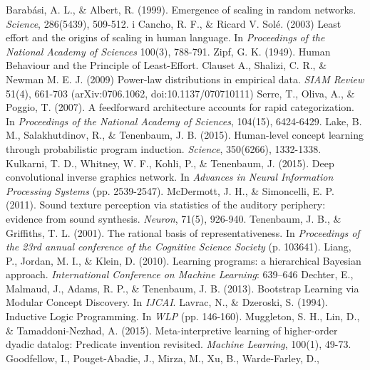 \documentclass[11pt,letterpaper]{article}
\begin{document}
\begin{thebibliography}{}
    Barab\'asi, A. L., \& Albert, R. (1999).
    Emergence of scaling in random networks.
    \emph{Science}, 286(5439), 509-512.
   i Cancho, R. F., \& Ricard V. Solé. (2003)
    Least effort and the origins of scaling in human language.
    In \emph{Proceedings of the National Academy of Sciences} 100(3), 788-791.
   Zipf, G. K. (1949).
    Human Behaviour and the Principle of Least-Effort.
   Clauset A., Shalizi, C. R., \& Newman M. E. J.  (2009)
    Power-law distributions in empirical data.
    \emph{SIAM Review} 51(4), 661-703 (arXiv:0706.1062, doi:10.1137/070710111)
    Serre, T., Oliva, A., \& Poggio, T. (2007).
    A feedforward architecture accounts for rapid categorization.
    In \emph{Proceedings of the National Academy of Sciences}, 104(15), 6424-6429.
   Lake, B. M., Salakhutdinov, R., \& Tenenbaum, J. B. (2015).
    Human-level concept learning through probabilistic program induction.
    \emph{Science}, 350(6266), 1332-1338.
    Kulkarni, T. D., Whitney, W. F., Kohli, P., \& Tenenbaum, J. (2015).
    Deep convolutional inverse graphics network.
    In \emph{Advances in Neural Information Processing Systems} (pp. 2539-2547).
    McDermott, J. H., \& Simoncelli, E. P. (2011).
    Sound texture perception via statistics of the auditory periphery:
    evidence from sound synthesis.
    \emph{Neuron}, 71(5), 926-940.
    Tenenbaum, J. B., \& Griffiths, T. L. (2001).
    The rational basis of representativeness.
    In \emph{Proceedings of the 23rd annual conference of the Cognitive
    Science Society} (p. 103641).
    Liang, P., Jordan, M. I., \& Klein, D. (2010).
    Learning programs: a hierarchical Bayesian approach.
    \emph{International Conference on Machine Learning}: 639–646
    Dechter, E., Malmaud, J., Adams, R. P., \& Tenenbaum, J. B. (2013).
    Bootstrap Learning via Modular Concept Discovery.
    In \emph{IJCAI}.
    Lavrac, N., \& Dzeroski, S. (1994).
    Inductive Logic Programming.
    In \emph{WLP} (pp. 146-160).
    Muggleton, S. H., Lin, D., \& Tamaddoni-Nezhad, A. (2015).
    Meta-interpretive learning of higher-order dyadic datalog: Predicate
    invention revisited.
    \emph{Machine Learning}, 100(1), 49-73.
    Goodfellow, I., Pouget-Abadie, J., Mirza, M., Xu, B., Warde-Farley, D.,

\end{thebibliography}
\end{document}
